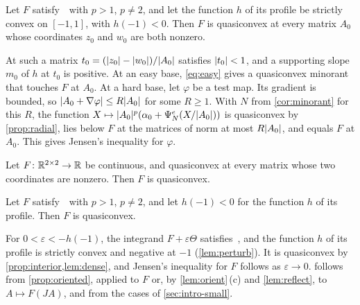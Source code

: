 \begin{proposition}\label{prop:interior}
Let $F$ satisfy~\Hyp\ with $p>1$, $p\ne2$, and let the function $h$ of its profile be strictly
convex on $[-1,1]$, with $h(-1)<0$. Then $F$ is quasiconvex at every matrix $A_0$ whose
coordinates $z_0$ and $w_0$ are both nonzero.
\end{proposition}

At such a matrix $t_0=(\lvert z_0\rvert-\lvert w_0\rvert)/\lvert A_0\rvert$ satisfies $\lvert t_0\rvert<1$, and a supporting
slope $m_0$ of $h$ at $t_0$ is positive. At an easy base, \eqref{eq:easy} gives a quasiconvex
minorant that touches $F$ at $A_0$. At a hard base, let $\varphi$ be a test map. Its gradient is
bounded, so $\lvert A_0+\nabla\varphi\rvert\le R\lvert A_0\rvert$ for some $R\ge1$. With $N$ from
\cref{cor:minorant} for this $R$, the function $X\mapsto\lvert A_0\rvert^p(\alpha_0+
\Psi^e_N(X/\lvert A_0\rvert))$ is quasiconvex by \cref{prop:radial}, lies below $F$ at the matrices of norm
at most $R\lvert A_0\rvert$, and equals $F$ at $A_0$. This gives Jensen's inequality for $\varphi$.

\begin{lemma}\label{lem:dense}
Let $F\colon\mathbb{R}^{2\times 2}\to\mathbb{R}$ be continuous, and quasiconvex at every matrix whose two coordinates are
nonzero. Then $F$ is quasiconvex.
\end{lemma}

\begin{proposition}\label{prop:oriented}
Let $F$ satisfy~\Hyp\ with $p>1$, $p\ne2$, and let $h(-1)<0$ for the function $h$ of its
profile. Then $F$ is quasiconvex.
\end{proposition}

For $0<\varepsilon<-h(-1)$, the integrand $F+\varepsilon\Theta$ satisfies~\Hyp, and the function
$h$ of its profile is strictly convex and negative at $-1$ (\cref{lem:perturb}). It is
quasiconvex by \cref{prop:interior,lem:dense}, and Jensen's inequality for $F$ follows as
$\varepsilon\to0$.  follows from \cref{prop:oriented}, applied to $F$ or, by
\cref{lem:orient}\,(c) and \cref{lem:reflect}, to $A\mapsto F(JA)$, and from the cases of
\cref{sec:intro-small}.

